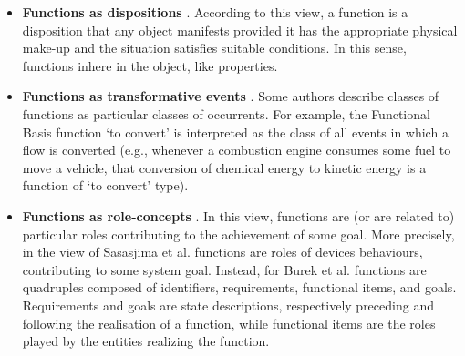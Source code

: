 \documentclass[
]{ceurart}
\begin{document}
\begin{itemize}
  \item \textbf{Functions as dispositions} \cite{arpFunctionRoleDisposition2008, barryBasicFormalOntology2015}. According to this view, a function is a disposition that any object manifests provided it has the appropriate physical make-up and the situation satisfies suitable conditions. In this sense, functions inhere in the object, like properties. 
  \item \textbf{Functions as transformative events} \cite{borgoFormalizationFunctionsOperations2011, garbaczTwoOntologydrivenFormalisations2011, garbaczStandardTaxonomyArtifact2005}.
  Some authors describe classes of functions as particular classes of occurrents. For example, the Functional Basis function `to convert' is interpreted as the class of all events in which a flow is converted (e.g., whenever a combustion engine consumes some fuel to move a vehicle, that conversion of chemical energy to kinetic energy is a function of `to convert' type).%
  \item \textbf{Functions as role-concepts} \cite{sasajimaFBRLFunctionBehavior1995,burekToplevelOntologyFunctions2006}. In this view, functions are (or are related to) particular roles contributing to the achievement of some goal. More precisely, in the view of Sasasjima et al. \cite{sasajimaFBRLFunctionBehavior1995} functions are roles of devices behaviours, contributing to some system goal. Instead, for Burek et al. \cite{burekToplevelOntologyFunctions2006} functions are quadruples composed of identifiers, requirements, functional items, and goals. Requirements and goals are state descriptions, respectively preceding and following the realisation of a function, while functional items are the roles played by the entities realizing the function. 
\end{itemize}
\end{document}
